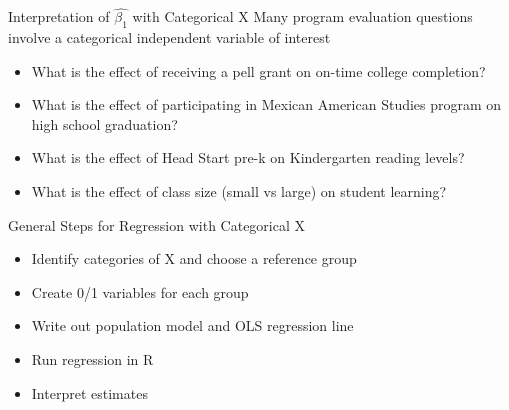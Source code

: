 \documentclass[
  8pt,
  ignorenonframetext,
  dvipsnames]{beamer}
\providecommand{\tightlist}{%
  \setlength{\itemsep}{0pt}\setlength{\parskip}{0pt}}
\let\olditem\item
\renewcommand{\item}{%
  \olditem\vspace{4pt}
}
\begin{document}
\begin{frame}{Interpretation of \(\hat{\beta_1}\) with Categorical X}
Many program evaluation questions involve a categorical independent
variable of interest

\begin{itemize}
\tightlist
\item
  What is the effect of receiving a pell grant on on-time college
  completion?
\item
  What is the effect of participating in Mexican American Studies
  program on high school graduation?
\item
  What is the effect of Head Start pre-k on Kindergarten reading levels?
\item
  What is the effect of class size (small vs large) on student learning?
\end{itemize}

\end{frame}

\begin{frame}{General Steps for Regression with Categorical X}
\protect\hypertarget{general-steps-for-regression-with-categorical-x}{}

\begin{itemize}
\tightlist
\item
  Identify categories of X and choose a reference group
\item
  Create 0/1 variables for each group
\item
  Write out population model and OLS regression line
\item
  Run regression in R
\item
  Interpret estimates
\end{itemize}

\end{frame}
\end{document}
